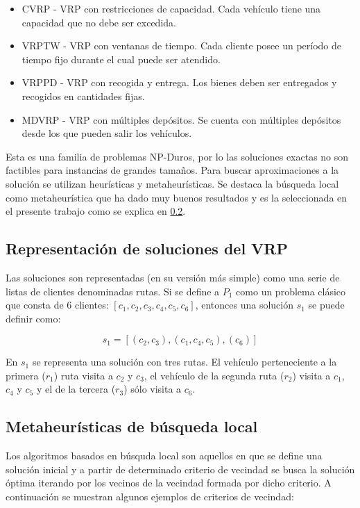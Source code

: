 \begin{itemize}
	\item CVRP - VRP con restricciones de capacidad. Cada vehículo tiene una capacidad que no debe ser excedida.
	\item VRPTW - VRP con ventanas de tiempo. Cada cliente posee un período de tiempo fijo durante el cual puede ser atendido.
	\item VRPPD - VRP con recogida y entrega. Los bienes deben ser entregados y recogidos en cantidades fijas.
	\item MDVRP - VRP con múltiples depósitos. Se cuenta con múltiples depósitos desde los que pueden salir los vehículos.
\end{itemize}

Esta es una familia de problemas NP-Duros, por lo las soluciones exactas no son factibles para instancias de grandes tamaños. Para buscar aproximaciones a la solución se utilizan heurísticas y metaheurísticas. Se destaca la búsqueda local como metaheurística que ha dado muy buenos resultados y es la seleccionada en el presente trabajo como se explica en \ref{2-Local}.

\subsection{Representación de soluciones del VRP}\label{2-Sol}
Las soluciones son representadas (en su versión más simple) como una serie de listas de clientes denominadas rutas.
Si se define a $P_1$ como un problema clásico que consta de 6 clientes: $[c_1, c_2, c_3, c_4, c_5, c_6]$, entonces una solución $s_1$ se puede definir como:

\begin{equation}
s_1 = [(c_2,c_3), (c_1,c_4,c_5), (c_6)]
\end{equation}

En $s_1$ se representa una solución con tres rutas. El vehículo perteneciente a la primera ($r_1$) ruta visita a $c_2$ y $c_3$, el vehículo de la segunda ruta ($r_2$) visita a $c_1$, $c_4$ y $c_5$ y el de la tercera ($r_3$) sólo visita a $c_6$.


\subsection{Metaheurísticas de búsqueda local}\label{2-Local}
Los algoritmos basados en búsquda local son aquellos en que se define una solución inicial y a partir de determinado criterio de vecindad se busca la solución óptima iterando por los vecinos de la vecindad formada por dicho criterio. A continuación se muestran algunos ejemplos de criterios de vecindad:

